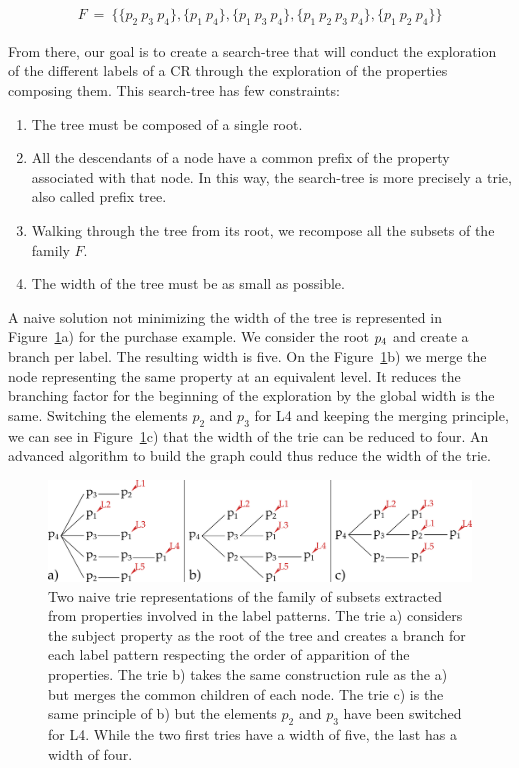 \begin{align*}
 F\ =\ \{\{p_2\ p_3\ p_4\},
\{p_1\ p_4\},
\{p_1\ p_3\ p_4\},
\{p_1\ p_2\ p_3\ p_4\},
\{p_1\ p_2\ p_4\}\}
\end{align*}

From there, our goal is to create a search-tree that will conduct the exploration of the different labels of a CR through the exploration of the properties composing them. This search-tree has few constraints:
\begin{enumerate}
	\item The tree must be composed of a single root.
	\item All the descendants of a node have a common prefix of the property associated with that node. In this way, the search-tree is more precisely a trie, also called prefix tree.
	\item Walking through the tree from its root, we recompose all the subsets of the family $F$.
	\item The width of the tree must be as small as possible.
\end{enumerate}

A naive solution not minimizing the width of the tree is represented in Figure~\ref{fig:chap7_naive}a) for the purchase example. We consider the root $p_4$ and create a branch per label. The resulting width is five. On the Figure~\ref{fig:chap7_naive}b) we merge the node representing the same property at an equivalent level. It reduces the branching factor for the beginning of the exploration by the global width is the same. Switching the elements $p_2$ and $p_3$ for L4 and keeping the merging principle, we can see in Figure~\ref{fig:chap7_naive}c) that the width of the trie can be reduced to four. An advanced algorithm to build the graph could thus reduce the width of the trie.

\begin{figure}[ht!]
\centering
\includegraphics[width=\textwidth]{figures/chapter7/naive.png}
\caption{\label{fig:chap7_naive} Two naive trie representations of the family of subsets extracted from properties involved in the label patterns. The trie a) considers the subject property as the root of the tree and creates a branch for each label pattern respecting the order of apparition of the properties. The trie b) takes the same construction rule as the a) but merges the common children of each node. The trie c) is the same principle of b) but the elements $p_2$ and $p_3$ have been switched for L4. While the two first tries have a width of five, the last has a width of four.}
\end{figure}

